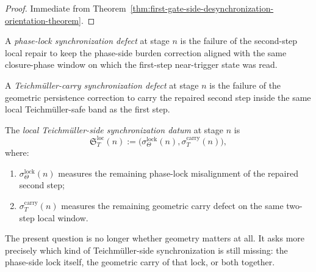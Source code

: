\begin{proof}
Immediate from Theorem~\ref{thm:first-gate-side-desynchronization-orientation-theorem}.
\end{proof}




\begin{definition}
\label{def:phase-lock-synchronization-defect}
A \emph{phase-lock synchronization defect} at stage $n$ is the failure of the second-step local repair to keep the phase-side burden correction aligned with the same closure-phase window on which the first-step near-trigger state was read.
\end{definition}

\begin{definition}
\label{def:teichmueller-carry-synchronization-defect}
A \emph{Teichm\"uller-carry synchronization defect} at stage $n$ is the failure of the geometric persistence correction to carry the repaired second step inside the same local Teichm\"uller-safe band as the first step.
\end{definition}

\begin{definition}
\label{def:local-teichmueller-side-synchronization-datum}
The \emph{local Teichm\"uller-side synchronization datum} at stage $n$ is
\[
 \mathfrak S_T^{\mathrm{loc}}(n)
 :=
 \bigl(
 \sigma_{\Theta}^{\mathrm{lock}}(n),
 \sigma_{T}^{\mathrm{carry}}(n)
 \bigr),
\]
where:
\begin{enumerate}[leftmargin=2em,label=(\alph*)]
 \item $\sigma_{\Theta}^{\mathrm{lock}}(n)$ measures the remaining phase-lock misalignment of the repaired second step;
 \item $\sigma_T^{\mathrm{carry}}(n)$ measures the remaining geometric carry defect on the same two-step local window.
\end{enumerate}
\end{definition}

\begin{remark}
\label{rem:what-synchronization-means-locally}
The present question is no longer whether geometry matters at all. It asks more precisely which kind of Teichm\"uller-side synchronization is still missing: the phase-side lock itself, the geometric carry of that lock, or both together.
\end{remark}

